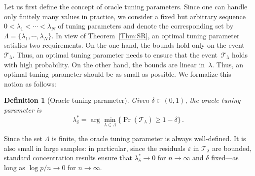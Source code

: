 \documentclass{elsarticle}
\newtheorem{definition}{Definition}
\newcommand{\oldnew}{}
\newcommand{\argmin}{\arg\!\min}
\newcommand{\tuning}{{\lambda}}
\newcommand{\redef}{=}
\begin{document}
Let us first define the concept of oracle tuning parameters. Since one can handle only finitely many values in practice, we consider a fixed but arbitrary  sequence $ 0< \tuning_1 < \cdots < \tuning_N$ of tuning parameters and denote  the corresponding set by $\Lambda\redef \{\tuning_1,\cdots,\tuning_N\}$.
In view of Theorem~\ref{Thm:SR}, an optimal tuning parameter satisfies two requirements.  On the one hand, the bounds hold only on the  event~$\mathcal{T}_{\tuning}$. Thus, an optimal tuning parameter needs to ensure that the event~$\mathcal{T}_{\tuning}$ holds with high probability. On the other hand, the bounds are linear in~$\tuning$. Thus, an optimal tuning parameter should be as small as possible.  We formalize this notion as follows:
      \begin{definition}[Oracle tuning parameter]
     Given $\delta\in (0,1)$, the oracle tuning parameter is
     \begin{equation}
       \tuning_{\delta}^*\redef \argmin_{\tuning \in \Lambda}\{\Pr(\mathcal{T}_{\tuning})\geq 1-\delta\}\,.
     \end{equation}
   \end{definition}
\noindent Since the set $\Lambda$ is finite, the oracle tuning parameter is always well-defined. {\oldnew It is also small in large samples: in particular, since the residuals $\varepsilon$ in $\mathcal{T}_{\tuning}$ are bounded, standard concentration results ensure that  $\lambda^*_\delta\to 0$ for $n\to\infty$ and $\delta$ fixed---as long as $\log p/n\to 0$ for $n\to\infty$.}
\end{document}
